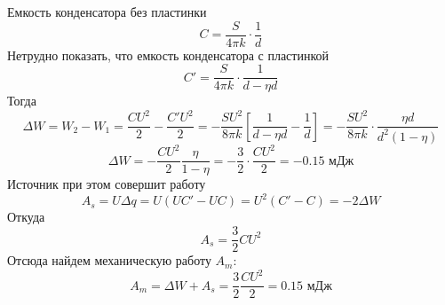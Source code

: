 \documentclass[a4paper,14pt]{extarticle}
\begin{document}
Емкость конденсатора без пластинки
\begin{equation}
  C=\frac{S}{4\pi k}\cdot\frac{1}{d}
\end{equation}
Нетрудно показать, что емкость конденсатора с пластинкой
\begin{equation}
  C'=\frac{S}{4\pi k}\cdot\frac{1}{d-\eta d}
\end{equation}
Тогда
\begin{equation}
  \Delta W = W_2-W_1=\frac{CU^2}{2}-\frac{C'U^2}{2}=
  -\frac{SU^2}{8\pi k}
  \left[
    \frac{1}{d-\eta d}-
    \frac{1}{d}
  \right]=-\frac{SU^2}{8\pi k }\cdot\frac{\eta d}{d^2(1-\eta)}
\end{equation}
\begin{equation}
  \Delta W = -\frac{CU^2}{2} \frac{\eta}{1-\eta}=-\frac32\cdot\frac{CU^2}{2}=-0.15 \text{ мДж}
\end{equation}
Источник при этом совершит работу
\begin{equation}
  A_{s}=U\Delta q=U(UC'-UC)=U^2(C'-C)=-2\Delta W
\end{equation}
Откуда
\begin{equation}
  A_{s}=\frac32 CU^2
\end{equation}
Отсюда найдем механическую работу $A_m$:
\begin{equation}
  A_m=\Delta W + A_s = \frac32\frac{CU^2}{2}=0.15 \text{ мДж}
\end{equation}
\end{document}
